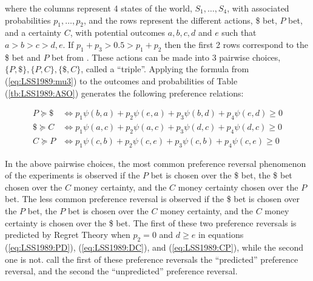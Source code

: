 \documentclass[11pt,a4paper]{report}
\begin{document}
\noindent where the columns represent 4 states of the world, $S_1 , \ldots , S_4$, with associated probabilities $p_1, \ldots, p_2$, and the rows represent the different actions, \$ bet, $P$ bet, and a certainty $C$, with potential outcomes $a,b,c,d$ and $e$ such that $a > b > c > d,e$.
If $p_1 + p_3 > 0.5 > p_1 + p_2$ then the first 2 rows correspond to the \$ bet and $P$ bet from \textcite{Grether1979}.
These actions can be made into 3 pairwise choices, $\lbrace P , \$ \rbrace , \lbrace P,C \rbrace , \lbrace \$, C \rbrace$, called a \enquote{triple}.
Applying the formula from (\ref{eq:LSS1989:mu3}) to the outcomes and probabilities of Table (\ref{tb:LSS1989:ASO}) generates the following preference relations:

\begin{align}
	P  \succcurlyeq \$ &\Leftrightarrow p_1 \psi(b,a) + p_2 \psi(e,a) + p_3 \psi(b,d) + p_4 \psi(e,d) \geq 0 \label{eq:LSS1989:PD}\\
	\$ \succcurlyeq C  &\Leftrightarrow p_1 \psi(a,c) + p_2 \psi(a,c) + p_3 \psi(d,c) + p_4 \psi(d,c) \geq 0 \label{eq:LSS1989:DC}\\
	C  \succcurlyeq P  &\Leftrightarrow p_1 \psi(c,b) + p_2 \psi(c,e) + p_3 \psi(c,b) + p_4 \psi(c,e) \geq 0 \label{eq:LSS1989:CP}
\end{align}

In the above pairwise choices, the most common preference reversal phenomenon of the \textcite{Grether1979} experiments is observed if the $P$ bet is chosen over the \$ bet, the \$ bet chosen over the $C$ money certainty, and the $C$ money certainty chosen over the $P$ bet.
The less common preference reversal is observed if the \$ bet is chosen over the $P$ bet, the $P$ bet is chosen over the $C$ money certainty, and the $C$ money certainty is chosen over the \$ bet.
The first of these two preference reversals is predicted by Regret Theory when $p_2 =0$ and $d \geq e$ in equations (\ref{eq:LSS1989:PD}), (\ref{eq:LSS1989:DC}), and (\ref{eq:LSS1989:CP}), while the second one is not.
\textcite[143]{Loomes1989} call the first of these preference reversals the \enquote{predicted} preference reversal, and the second the \enquote{unpredicted} preference reversal.
\end{document}
